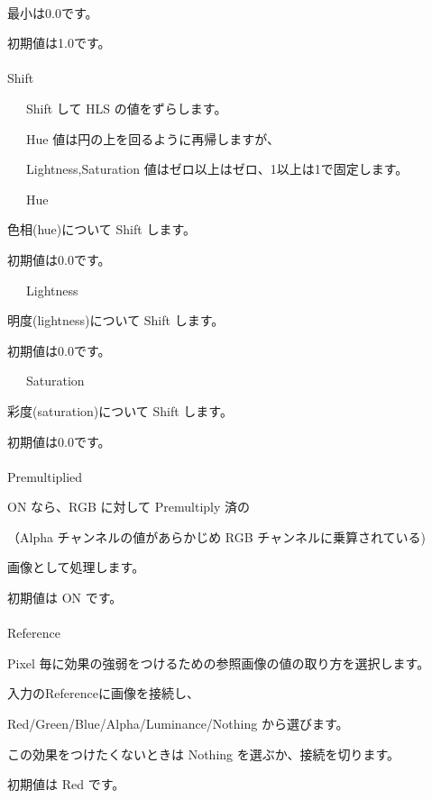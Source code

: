 \documentclass[a4paper,12pt]{article}
\begin{document}
\newpage

\thispagestyle{empty}

\ \vspace{-0.2em}
\par
最小は0.0です。\par
初期値は1.0です。\\
\\
Shift\par
\noindent \ \ \, Shift して HLS の値をずらします。\par
\noindent \ \ \, Hue 値は円の上を回るように再帰しますが、\par
\noindent \ \ \, Lightness,Saturation 値はゼロ以上はゼロ、1以上は1で固定します。\\
\par
\noindent \ \ \, Hue\par
色相(hue)について Shift します。\par
初期値は0.0です。\par
\noindent \ \ \, Lightness\par
明度(lightness)について Shift します。\par
初期値は0.0です。\par
\noindent \ \ \, Saturation\par
彩度(saturation)について Shift します。\par
初期値は0.0です。\\
\\
Premultiplied\par
ON なら、RGB に対して Premultiply 済の\par
（Alpha チャンネルの値があらかじめ RGB チャンネルに乗算されている)\par
画像として処理します。\par
初期値は ON です。\\
\\
Reference\par
Pixel 毎に効果の強弱をつけるための参照画像の値の取り方を選択します。\par
入力の\textquotedbl Reference\textquotedbl に画像を接続し、\par
Red/Green/Blue/Alpha/Luminance/Nothing から選びます。\par
この効果をつけたくないときは Nothing を選ぶか、接続を切ります。\par
初期値は Red です。
\end{document}
